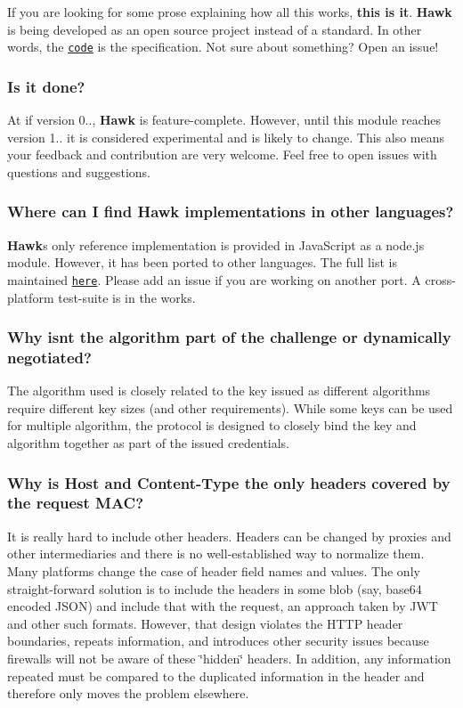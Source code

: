 If you are looking for some prose explaining how all this works, {\bfseries this is it}. {\bfseries Hawk} is being developed as an open source project instead of a standard. In other words, the \href{/hueniverse/hawk/tree/master/lib}{\tt code} is the specification. Not sure about something? Open an issue!

\subsubsection*{Is it done?}

At if version 0.., {\bfseries Hawk} is feature-\/complete. However, until this module reaches version 1.. it is considered experimental and is likely to change. This also means your feedback and contribution are very welcome. Feel free to open issues with questions and suggestions.

\subsubsection*{Where can I find {\bfseries Hawk} implementations in other languages?}

{\bfseries Hawk}\textquotesingle{}s only reference implementation is provided in Java\+Script as a node.\+js module. However, it has been ported to other languages. The full list is maintained \href{https://github.com/hueniverse/hawk/issues?labels=port&state=closed}{\tt here}. Please add an issue if you are working on another port. A cross-\/platform test-\/suite is in the works.

\subsubsection*{Why isn\textquotesingle{}t the algorithm part of the challenge or dynamically negotiated?}

The algorithm used is closely related to the key issued as different algorithms require different key sizes (and other requirements). While some keys can be used for multiple algorithm, the protocol is designed to closely bind the key and algorithm together as part of the issued credentials.

\subsubsection*{Why is Host and Content-\/\+Type the only headers covered by the request M\+A\+C?}

It is really hard to include other headers. Headers can be changed by proxies and other intermediaries and there is no well-\/established way to normalize them. Many platforms change the case of header field names and values. The only straight-\/forward solution is to include the headers in some blob (say, base64 encoded J\+S\+O\+N) and include that with the request, an approach taken by J\+W\+T and other such formats. However, that design violates the H\+T\+T\+P header boundaries, repeats information, and introduces other security issues because firewalls will not be aware of these \char`\"{}hidden\char`\"{} headers. In addition, any information repeated must be compared to the duplicated information in the header and therefore only moves the problem elsewhere.

